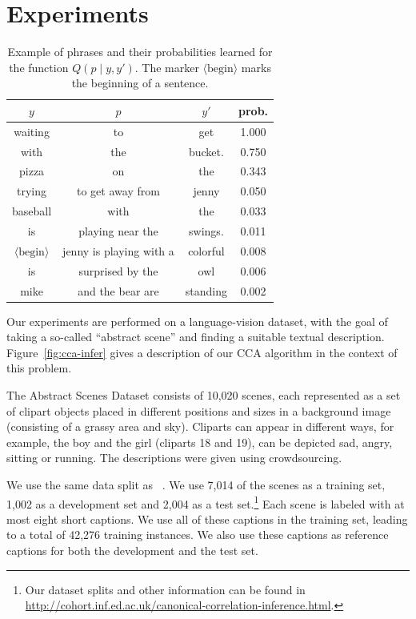 \documentclass[letterpaper]{article}
\newcommand{\newcite}[1]{\citeauthor{#1}~\shortcite{#1}}
\begin{document}
\section{Experiments}
\label{section:experiments}
\begin{table}
{\small
\begin{tabular}{|ccc|c|}
\hline
$y$ & $p$ & $y'$ & prob. \\
\hline
waiting & to & get & 1.000 \\
with & the & bucket. & 0.750 \\
pizza & on & the & 0.343 \\
trying & to get away from & jenny & 0.050 \\
baseball & with & the & 0.033 \\
is & playing near the & swings. & 0.011 \\
$\langle \mathrm{begin} \rangle$ & jenny is playing with a & colorful & 0.008 \\
is & surprised by the & owl & 0.006 \\
mike & and the bear are & standing & 0.002 \\
\hline
\end{tabular}
}
\caption{Example of phrases and their probabilities learned for the function $Q(p \mid y, y')$. The marker $\langle \mathrm{begin} \rangle$ marks the beginning of a sentence. \label{table:phrases}}
\end{table}


Our experiments are performed on a language-vision dataset, with the goal of taking a so-called ``abstract scene'' \cite{zitnick2013bringing}
and finding a suitable textual description. Figure~\ref{fig:cca-infer} gives a description of our CCA algorithm
in the context of this problem.

The Abstract Scenes Dataset consists of 10,020 scenes, each represented as a set of clipart objects placed in different
positions and sizes in a background image (consisting of a grassy area and sky).
Cliparts can appear in different ways, for example, the boy and the girl (cliparts 18 and 19), can be depicted
sad, angry, sitting or running. The descriptions were given using crowdsourcing.

We use the same data split as \newcite{ortiz2015learning}. We use 7,014 of the scenes as a training set, 1,002 as a development
set and 2,004 as a test set.\footnote{Our dataset splits and other information can be found in \url{http://cohort.inf.ed.ac.uk/canonical-correlation-inference.html}.}
Each scene is labeled with at most eight short captions. We use all of these captions in the training set, leading to a total
of 42,276 training instances. We also use these captions as reference captions for both the development and the test set.
\end{document}
